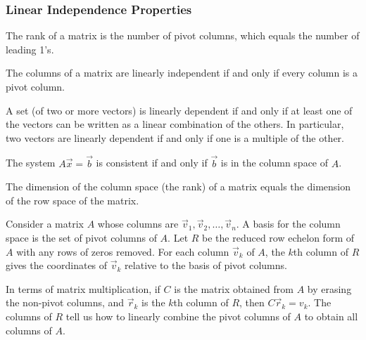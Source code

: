 \subsubsection{Linear Independence Properties}

\begin{theorem}\label{thm rank equal pivot columns}
The rank of a matrix is the number of pivot columns, which equals the number of leading 1's. 
\end{theorem}

\begin{theorem}\label{every column pivot iff independent}
The columns of a matrix are linearly independent if and only if every column is a pivot column.
\end{theorem}

\begin{theorem}\label{dependentiff}
A set (of two or more vectors) is linearly dependent if and only if at least one of the vectors can be written as a linear combination of the others. In particular, two vectors are linearly dependent if and only if one is a multiple of the other.
\end{theorem}


\begin{theorem}
The system $A\vec x=\vec b$ is consistent if and only if $\vec b$ is in the column space of $A$. 
\end{theorem}


\begin{theorem}\label{rankrowcolumn}
The dimension of the column space (the rank) of a matrix equals the dimension of the row space of the matrix.
\end{theorem}


\begin{theorem}\label{thm colsp basis}
Consider a matrix $A$ whose columns are $\vec v_1,\vec v_2,\ldots,\vec v_n$. A basis for the column space is the set of pivot columns of $A$.  Let $R$ be the reduced row echelon form of $A$ with any rows of zeros removed. For each column $\vec v_k$ of $A$, the $k$th column of $R$ gives the coordinates of $\vec v_k$ relative to the basis of pivot columns.
  
In terms of matrix multiplication, if $C$ is the matrix obtained from $A$ by erasing the non-pivot columns, and $\vec r_k$ is the $k$th column of $R$, then $C\vec r_k=v_k$. The columns of $R$ tell us how to linearly combine the pivot columns of $A$ to obtain all columns of $A$.
\end{theorem}

